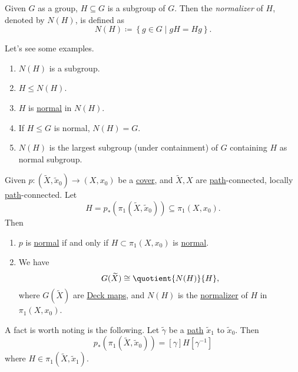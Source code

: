 \begin{definition}[Normalizer]\label{def:normalizer}
	Given \(G\) as a group, \(H\subseteq G\) is a subgroup of \(G\). Then the \emph{normalizer} of \(H\), denoted by \(N(H)\), is defined as
	\[
		N(H) \coloneqq \left\{g\in G \mid gH = H g\right\}.
	\]
\end{definition}

\begin{eg}
	Let's see some examples.
	\begin{enumerate}
		\item \(N(H)\) is a subgroup.
		\item \(H\leq N(H)\).
		\item \(H\) is \underline{normal} in \(N(H)\).
		\item If \(H\leq G\) is normal, \(N(H) = G\).
		\item \(N(H)\) is the largest subgroup (under containment) of \(G\) containing \(H\) as normal subgroup.
	\end{enumerate}
\end{eg}

\begin{proposition}
	Given \(p\colon (\widetilde{X} , \widetilde{x} _0)\to (X, x_0)\) be a \hyperref[def:covering-map]{cover}, and \(\widetilde{X} , X\)
	are \hyperref[def:path]{path}-connected, locally \hyperref[def:path]{path}-connected. Let
	\[
		H = p_\ast \left(\pi _1(\widetilde{X} , \widetilde{x} _0)\right)\subseteq \pi _1(X, x_0).
	\]
	Then
	\begin{enumerate}
		\item \(p\) is \hyperref[def:normal]{normal} if and only if \(H\subset \pi _1(X, x_0)\) is \hyperref[def:normal]{normal}.
		\item We have
		      \[
			      G(\widetilde{X} )\cong \quotient{N(H)}{H},
		      \]
		      where \(G(\widetilde{X} )\) are \hyperref[def:deck-transformation]{Deck maps}, and \(N(H)\) is the \hyperref[def:normalizer]{normalizer}
		      of \(H\) in \(\pi _1(X, x_0)\).
	\end{enumerate}
\end{proposition}

\begin{remark}
	A fact is worth noting is the following. Let \(\widetilde{\gamma} \) be a \hyperref[def:path]{path} \(\widetilde{x} _1\) to \(\widetilde{x} _0\).
	Then
	\[
		p_\ast \left(\pi _1(\widetilde{X} , \widetilde{x} _0)\right)= [\gamma ] H [\gamma ^{-1}]
	\]
	where \(H\in \pi _1(\widetilde{X} , \widetilde{x} _1)\).
	\begin{figure}[H]
		\centering
		\label{fig:rmk:lec17:1}
	\end{figure}
\end{remark}